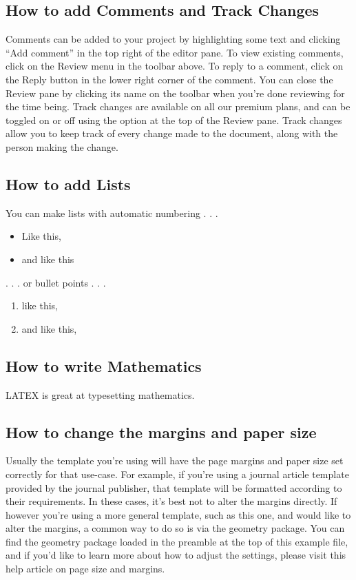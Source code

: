 \documentclass{article}
\begin{document}
 \subsection{How to add Comments and Track Changes}
 Comments can be added to your project by highlighting some text and clicking “Add comment” in
 the top right of the editor pane. To view existing comments, click on the Review menu in the toolbar
 above. To reply to a comment, click on the Reply button in the lower right corner of the comment.
 You can close the Review pane by clicking its name on the toolbar when you’re done reviewing for the
 time being.
 Track changes are available on all our premium plans, and can be toggled on or off using the option
 at the top of the Review pane. Track changes allow you to keep track of every change made to the
 document, along with the person making the change.
 \subsection{How to add Lists}
 You can make lists with automatic numbering . . .
\begin{itemize}
   \item Like this,
   \item and like this
\end{itemize}
  . . . or bullet points . . .
  \begin{enumerate}
 
     \item like this,
     \item and like this,
    \end{enumerate}
\subsection{How to write Mathematics}
LATEX is great at typesetting mathematics.
\subsection{How to change the margins and paper size}
Usually the template you’re using will have the page margins and paper size set correctly for that
use-case. For example, if you’re using a journal article template provided by the journal publisher,
that template will be formatted according to their requirements. In these cases, it’s best not to alter
the margins directly.
If however you’re using a more general template, such as this one, and would like to alter the
margins, a common way to do so is via the geometry package. You can find the geometry package
loaded in the preamble at the top of this example file, and if you’d like to learn more about how to
adjust the settings, please visit this help article on page size and margins.
\end{document}
